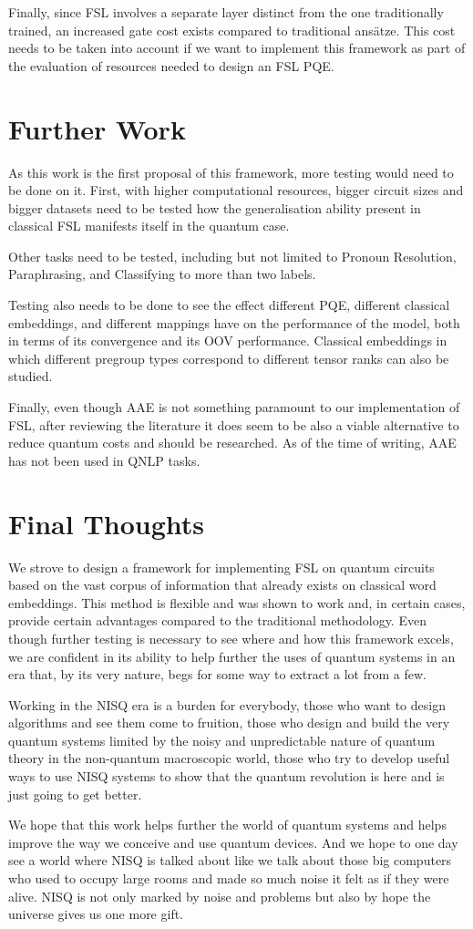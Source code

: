 Finally, since FSL involves a separate layer distinct from the one traditionally trained, an increased gate cost exists compared to traditional ans{\"a}tze. This cost needs to be taken into account if we want to implement this framework as part of the evaluation of resources needed to design an FSL PQE.

\section{Further Work}
As this work is the first proposal of this framework, more testing would need to be done on it. First, with higher computational resources, bigger circuit sizes and bigger datasets need to be tested how the generalisation ability present in classical FSL manifests itself in the quantum case. 

Other tasks need to be tested, including but not limited to  Pronoun Resolution, Paraphrasing, and Classifying to more than two labels. 

Testing also needs to be done to see the effect different PQE, different classical embeddings, and different mappings have on the performance of the model, both in terms of its convergence and its OOV performance. Classical embeddings in which different pregroup types correspond to different tensor ranks can also be studied.

Finally, even though AAE is not something paramount to our implementation of FSL, after reviewing the literature it does seem to be also a viable alternative to reduce quantum costs and should be researched. As of the time of writing, AAE has not been used in QNLP tasks.

\section{Final Thoughts}

We strove to design a framework for implementing FSL on quantum circuits based on the vast corpus of information that already exists on classical word embeddings. This method is flexible and was shown to work and, in certain cases, provide certain advantages compared to the traditional methodology. Even though further testing is necessary to see where and how this framework excels, we are confident in its ability to help further the uses of quantum systems in an era that, by its very nature, begs for some way to extract a lot from a few.

Working in the NISQ era is a burden for everybody, those who want to design algorithms and see them come to fruition, those who design and build the very quantum systems limited by the noisy and unpredictable nature of quantum theory in the non-quantum macroscopic world, those who try to develop useful ways to use NISQ systems to show that the quantum revolution is here and is just going to get better.

We hope that this work helps further the world of quantum systems and helps improve the way we conceive and use quantum devices. And we hope to one day see a world where NISQ is talked about like we talk about those big computers who used to occupy large rooms and made so much noise it felt as if they were alive. NISQ is not only marked by noise and problems but also by hope the universe gives us one more gift.